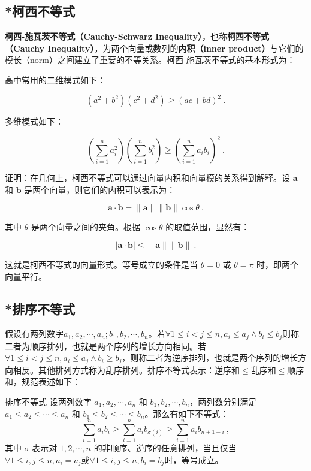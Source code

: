 \subsection{*柯西不等式}


\textbf{柯西-施瓦茨不等式（Cauchy-Schwarz Inequality）}，也称\textbf{柯西不等式（Cauchy Inequality）}，为两个向量或数列的\textbf{内积（inner product）}与它们的模长（norm）之间建立了重要的不等关系。柯西-施瓦茨不等式的基本形式为：

高中常用的二维模式如下：

\begin{equation}
\left( a^2 + b^2\right) \left(c^2 + d^2 \right) \geq \left( ac+bd \right)^2~.
\end{equation}

多维模式如下：

\begin{equation}
\left( \sum_{i=1}^{n} a_i^2 \right) \left( \sum_{i=1}^{n} b_i^2 \right) \geq \left( \sum_{i=1}^{n} a_i b_i \right)^2~.
\end{equation}

证明：在几何上，柯西不等式可以通过向量内积和向量模的关系得到解释。设 $\mathbf{a}$ 和 $\mathbf{b}$ 是两个向量，则它们的内积可以表示为：

$$\mathbf{a} \cdot \mathbf{b} = \|\mathbf{a}\| \|\mathbf{b}\| \cos \theta~.$$

其中 $\theta$ 是两个向量之间的夹角。根据 $\cos \theta$ 的取值范围，显然有：

$$|\mathbf{a} \cdot \mathbf{b}| \leq \|\mathbf{a}\| \|\mathbf{b}\|~.$$

这就是柯西不等式的向量形式。等号成立的条件是当 $\theta = 0$ 或 $\theta = \pi$ 时，即两个向量平行。

\subsection{*排序不等式}

假设有两列数字$a_1,a_2,\cdots,a_n;b_1,b_2,\cdots,b_n$。若$\forall 1\leq i<j\leq n,a_i\leq a_j\land b_i\leq b_j$则称二者为顺序排列，也就是两个序列的增长方向相同。若$\forall 1\leq i<j\leq n,a_i\leq a_j\land b_i\geq b_j$，则称二者为逆序排列，也就是两个序列的增长方向相反。其他排列方式称为乱序排列。排序不等式表示：逆序和$\leq$乱序和$\leq$顺序和，规范表述如下：

\begin{theorem}{排序不等式}
设两列数字 $a_1, a_2, \cdots, a_n$ 和 $b_1, b_2, \cdots, b_n$，两列数分别满足 $a_1 \leq a_2 \leq \cdots \leq a_n$ 和 $b_1 \leq b_2 \leq \cdots \leq b_n$。那么有如下不等式：
\begin{equation}
\sum_{i=1}^n a_i b_i \geq \sum_{i=1}^n a_i b_{\sigma(i)} \geq \sum_{i=1}^n a_i b_{n+1-i}~,
\end{equation}
其中 $\sigma$ 表示对 ${1, 2, \cdots, n}$ 的非顺序、逆序的任意排列，当且仅当$\forall 1\leq i,j\leq n,a_i=a_j$或$\forall 1\leq i,j\leq n,b_i=b_j$时，等号成立。
\end{theorem}

